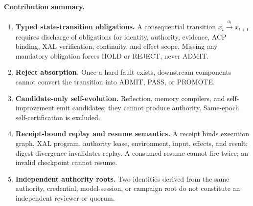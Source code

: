 \paragraph{Contribution summary.}
\begin{enumerate}
  \item \textbf{Typed state-transition obligations.} A consequential
  transition $x_t \xrightarrow{a_t} x_{t+1}$ requires discharge of
  obligations for identity, authority, evidence, ACP binding, XAL
  verification, continuity, and effect scope. Missing any mandatory
  obligation forces HOLD or REJECT, never ADMIT.
  \item \textbf{Reject absorption.} Once a hard fault exists, downstream
  components cannot convert the transition into ADMIT, PASS, or PROMOTE.
  \item \textbf{Candidate-only self-evolution.} Reflection, memory
  compilers, and self-improvement emit candidates; they cannot produce
  authority. Same-epoch self-certification is excluded.
  \item \textbf{Receipt-bound replay and resume semantics.} A receipt binds
  execution graph, XAL program, authority lease, environment, input,
  effects, and result; digest divergence invalidates replay. A consumed
  resume cannot fire twice; an invalid checkpoint cannot resume.
  \item \textbf{Independent authority roots.} Two identities derived from
  the same authority, credential, model-session, or campaign root do not
  constitute an independent reviewer or quorum.
\end{enumerate}
